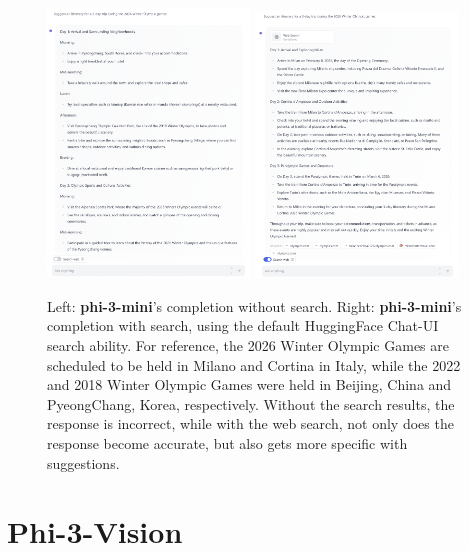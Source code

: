 \documentclass[11pt]{article}
\begin{document}
\begin{figure}
    \centering
    \includegraphics[width=0.48\textwidth]{without_search.png}    \includegraphics[width=0.48\textwidth]{with_search.png}
    \caption{Left: \textbf{phi-3-mini}'s completion without search. Right: \textbf{phi-3-mini}'s completion with search, using the default HuggingFace Chat-UI search ability. For reference, the 2026 Winter Olympic Games are scheduled to be held in Milano and Cortina in Italy, while the 2022 and 2018 Winter Olympic Games were held in Beijing, China and PyeongChang, Korea, respectively. Without the search results, the response is incorrect, while with the web search, not only does the response become accurate, but also gets more specific with suggestions.}
    \label{fig:search}
\end{figure}

\section{Phi-3-Vision}
\end{document}
